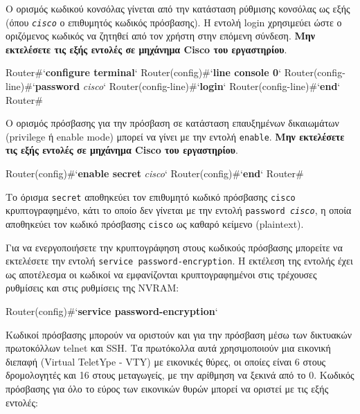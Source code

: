 \documentclass{EdipyLabs} %
\begin{document}

Ο ορισμός κωδικού κονσόλας γίνεται από την κατάσταση ρύθμισης κονσόλας ως εξής (όπου \texttt{\textit{cisco}} ο επιθυμητός κωδικός πρόσβασης). Η εντολή login χρησιμεύει ώστε ο οριζόμενος κωδικός να ζητηθεί από τον χρήστη στην επόμενη σύνδεση. \textbf{Μην εκτελέσετε τις εξής εντολές σε μηχάνημα Cisco του εργαστηρίου}.

\begin{CommandBox}
Router#`\textbf{configure terminal}`
Router(config)#`\textbf{line console 0}`
Router(config-line)#`\textbf{password} \textit{cisco}`
Router(config-line)#`\textbf{login}`
Router(config-line)#`\textbf{end}`
Router#
\end{CommandBox}

Ο ορισμός πρόσβασης για την πρόσβαση σε κατάσταση επαυξημένων δικαιωμάτων (privilege ή enable mode) μπορεί να γίνει με την εντολή \texttt{enable}. \textbf{Μην εκτελέσετε τις εξής εντολές σε μηχάνημα Cisco του εργαστηρίου}.

\begin{CommandBox}
Router(config)#`\textbf{enable secret} \textit{cisco}`
Router(config)#`\textbf{end}`
Router#
\end{CommandBox}

Το όρισμα \texttt{secret} αποθηκεύει τον επιθυμητό κωδικό πρόσβασης \texttt{cisco} κρυπτογραφημένο, κάτι το οποίο δεν γίνεται με την εντολή \texttt{password \textit{cisco}}, η οποία αποθηκεύει τον κωδικό πρόσβασης \texttt{cisco} ως καθαρό κείμενο (plaintext). 


Για να ενεργοποιήσετε την κρυπτογράφηση στους κωδικούς πρόσβασης μπορείτε να εκτελέσετε την εντολή \texttt{service password-encryption}. Η εκτέλεση της εντολής έχει ως αποτέλεσμα οι κωδικοί να εμφανίζονται κρυπτογραφημένοι στις τρέχουσες ρυθμίσεις και στις ρυθμίσεις της NVRAM:

\begin{CommandBox}
Router(config)#`\textbf{service password-encryption}`
\end{CommandBox}

Κωδικοί πρόσβασης μπορούν να οριστούν και για την πρόσβαση μέσω των δικτυακών πρωτοκόλλων telnet και SSH. Τα πρωτόκολλα αυτά χρησιμοποιούν μια εικονική διεπαφή (Virtual TeletYpe - VTY) με εικονικές θύρες, οι οποίες είναι 6 στους δρομολογητές και 16 στους μεταγωγείς, με την αρίθμηση να ξεκινά από το 0. Κωδικός πρόσβασης για όλο το εύρος των εικονικών θυρών μπορεί να οριστεί με τις εξής εντολές:
\end{document}
